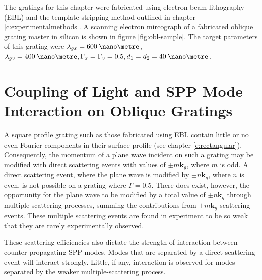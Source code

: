 The gratings for this chapter were fabricated using electron beam lithography (EBL) and the template stripping method outlined in chapter \ref{c:experimentalmethods}. A scanning electron mircograph of a fabricated oblique grating master in silicon is shown in figure \ref{fig:obl-sample}. The target parameters of this grating were ${\lambda_{gx}= 600 \:\nano\metre}$, ${\lambda_{gv}= 400 \:\nano\metre}, {\Gamma_x=\Gamma_v=0.5,d_1=d_2=40\:\nano\metre}$.

\section{Coupling of Light and SPP Mode Interaction on Oblique Gratings\label{s:ob-coupling}}
A square profile grating such as those fabricated using EBL contain little or no even-Fourier components in their surface profile (see chapter \ref{c:rectangular}). Consequently, the momentum of a plane wave incident on such a grating may be modified with direct scattering events with values of $\pm m\mathbf{k}_g$, where $m$ is odd.  A direct scattering event, where the plane wave is modified by $\pm n\mathbf{k}_g$, where $n$ is even, is not possible on a grating where $\Gamma=0.5$. There does exist, however, the opportunity for the plane wave to be modified by a total value of $\pm n\mathbf{k}_g$ through multiple-scattering processes, summing the contributions from $\pm m\mathbf{k}_g$ scattering events. These multiple scattering events are found in experiment to be so weak that they are rarely experimentally observed. 

These scattering efficiencies also dictate the strength of interaction between counter-propagating SPP modes. Modes that are separated by a direct scattering event will interact strongly. Little, if any, interaction is observed for modes separated by the weaker multiple-scattering process.

